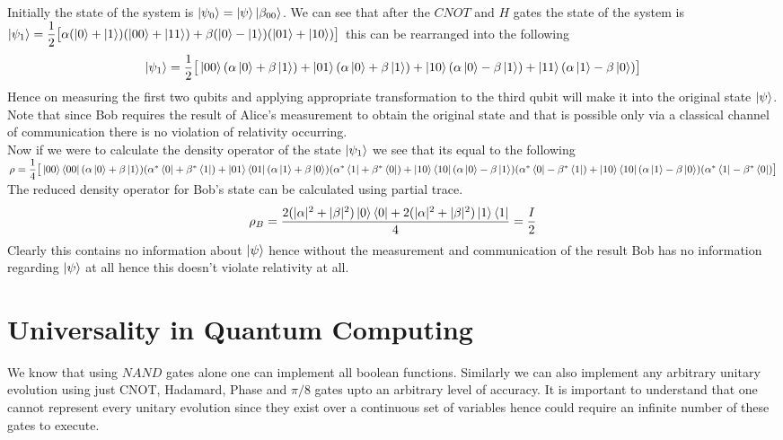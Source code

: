 \documentclass{report}
\begin{document}
Initially the state of the system is $\ket{\psi_0} = \ket{\psi}\ket{\beta_{00}}$. We can see that after the $CNOT$ and $H$ gates the state of the system is $\ket{\psi_1} = \dfrac{1}{2}\big[\alpha(\ket{0} + \ket{1})(\ket{00} + \ket{11}) + \beta(\ket{0} - \ket{1})(\ket{01} + \ket{10})\big]$ this can be rearranged into the following
$$\ket{\psi_1} = \dfrac{1}{2}\big[\ket{00}(\alpha\ket{0} + \beta\ket{1}) + \ket{01}(\alpha\ket{0} + \beta\ket{1}) + \ket{10}(\alpha\ket{0} - \beta\ket{1}) + \ket{11}(\alpha\ket{1} - \beta\ket{0})\big]$$
Hence on measuring the first two qubits and applying appropriate transformation to the third qubit will make it into the original state $\ket{\psi}$.
Note that since Bob requires the result of Alice's measurement to obtain the original state and that is possible only via a classical channel of communication there is no violation of relativity occurring.\\
Now if we were to calculate the density operator of the state $\ket{\psi_1}$ we see that its equal to the following\\
$\rho = \dfrac{1}{4}\big[\ket{00}\bra{00}(\alpha\ket{0} + \beta\ket{1})(\alpha^*\bra{0} + \beta^*\bra{1}) + \ket{01}\bra{01}(\alpha\ket{1} + \beta\ket{0})(\alpha^*\bra{1} + \beta^*\bra{0}) + \ket{10}\bra{10}(\alpha\ket{0} - \beta\ket{1})(\alpha^*\bra{0} - \beta^*\bra{1}) + \ket{10}\bra{10}(\alpha\ket{1} - \beta\ket{0})(\alpha^*\bra{1} - \beta^*\bra{0})\big]$\\
The reduced density operator for Bob's state can be calculated using partial trace.
$$\rho_B = \dfrac{2(|\alpha|^2 + |\beta|^2)\ket{0}\bra{0} + 2(|\alpha|^2 + |\beta|^2)\ket{1}\bra{1}}{4} = \dfrac{I}{2}$$
Clearly this contains no information about $\ket{\psi}$ hence without the measurement and communication of the result Bob has no information regarding $\ket{\psi}$ at all hence this doesn't violate relativity at all.


\section{Universality in Quantum Computing}
We know that using $NAND$ gates alone one can implement all boolean functions. Similarly we can also implement any arbitrary unitary evolution using just CNOT, Hadamard, Phase and $\pi/8$ gates upto an arbitrary level of accuracy. It is important to understand that one cannot represent every unitary evolution since they exist over a continuous set of variables hence could require an infinite number of these gates to execute.\\
\end{document}
